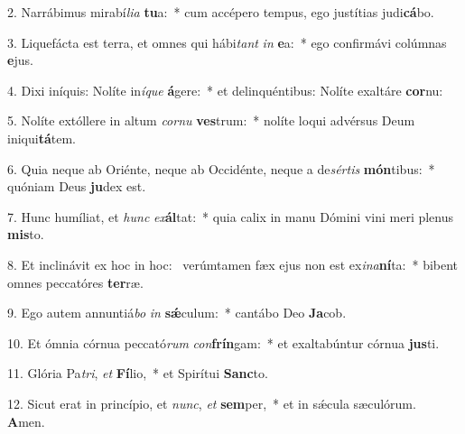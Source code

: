 2. Narrábimus mirabí\textit{li}\textit{a} \textbf{tu}a:~*  cum accépero tempus, ego justítias judi\textbf{cá}bo.\

3. Liquefácta est terra, et omnes qui hábi\textit{tant} \textit{in} \textbf{e}a:~*  ego confirmávi colúmnas \textbf{e}jus.\

4. Dixi iníquis: Nolíte in\textit{í}\textit{que} \textbf{á}gere:~*  et delinquéntibus: Nolíte exaltáre \textbf{cor}nu:\

5. Nolíte extóllere in altum \textit{cor}\textit{nu} \textbf{ves}trum:~*  nolíte loqui advérsus Deum iniqui\textbf{tá}tem.\

6. Quia neque ab Oriénte, neque ab Occidénte, neque a de\textit{sér}\textit{tis} \textbf{món}tibus:~*  quóniam Deus \textbf{ju}dex est.\

7. Hunc humíliat, et \textit{hunc} \textit{ex}\textbf{ál}tat:~*  quia calix in manu Dómini vini meri plenus \textbf{mis}to.\

8. Et inclinávit ex hoc in hoc: \dag\  verúmtamen fæx ejus non est ex\textit{i}\textit{na}\textbf{ní}ta:~*  bibent omnes peccatóres \textbf{ter}ræ.\

9. Ego autem annuntiá\textit{bo} \textit{in} \textbf{sǽ}culum:~*  cantábo Deo \textbf{Ja}cob.\

10. Et ómnia córnua peccató\textit{rum} \textit{con}\textbf{frín}gam:~*  et exaltabúntur córnua \textbf{jus}ti.\

11. Glória Pa\textit{tri}, \textit{et} \textbf{Fí}lio,~*  et Spirítui \textbf{Sanc}to.\

12. Sicut erat in princípio, et \textit{nunc}, \textit{et} \textbf{sem}per,~*  et in sǽcula sæculórum. \textbf{A}men.\

